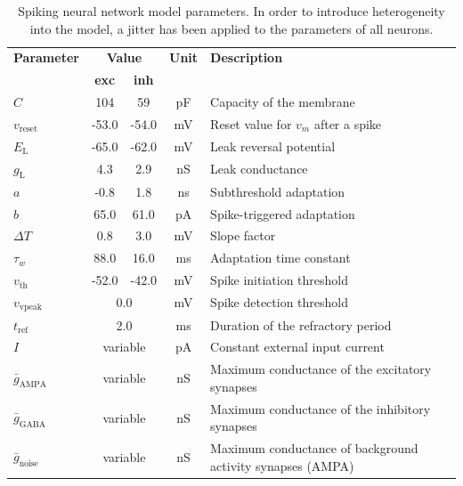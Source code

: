 \documentclass[../main.tex]{subfiles}
\begin{document}
\begin{table}[htbp]
    \caption{Spiking neural network model parameters.
    In order to introduce heterogeneity into the model, a jitter has been applied to the parameters of all neurons.}
    \label{tab:snmparams}
    \def\arraystretch{1.2}%
    \begin{tabularx}{\textwidth}{|l|c|c|c|X|}
        \hline 
        \textbf{Parameter} & \multicolumn{2}{c|}{\textbf{Value}} & 
        \textbf{Unit} &     \textbf{Description} \\ 
        \cline{2-3}
        & \textbf{exc} & \textbf{inh} &  & \\ 
        \hline
        $C$ & 104 & 59 &  pF & Capacity of the membrane \\ 
        \hline
        $v_\text{reset}$ & -53.0 & -54.0 & mV & Reset value for $v_m$ after a spike \\
        \hline
        $E_\text{L}$ & -65.0 & -62.0 & mV & Leak reversal potential \\
        \hline
        $g_\text{L}$ & 4.3 & 2.9 & nS & Leak conductance \\
        \hline  
        $a$ & -0.8 & 1.8 & ns & Subthreshold adaptation \\
        \hline 
        $b$ & 65.0 & 61.0 & pA & Spike-triggered adaptation \\
        \hline 
        $\Delta T$ & 0.8 & 3.0 & mV & Slope factor\\
        \hline 
        $\tau_w$ & 88.0 & 16.0 & ms & Adaptation time constant \\
        \hline 
        $v_\text{th}$ & -52.0 & -42.0 & mV & Spike initiation threshold\\
        \hline 
        $v_\text{vpeak}$ & \multicolumn{2}{c|}{0.0} & mV & Spike detection threshold\\
        \hline
        $t_\text{ref}$ & \multicolumn{2}{c|}{2.0} & ms & Duration of the refractory period \\
        \hline 
        $I$ & \multicolumn{2}{c|}{variable} & pA & Constant external input current \\
        \hline
        $\bar{g}_\text{AMPA}$ & \multicolumn{2}{c|}{variable} & nS & Maximum conductance of the excitatory synapses \\
        \hline
        $\bar{g}_\text{GABA}$ & \multicolumn{2}{c|}{variable} & nS & Maximum conductance of the inhibitory synapses \\
        \hline
        $\bar{g}_\text{noise}$ & \multicolumn{2}{c|}{variable} & nS & Maximum conductance of background activity synapses (AMPA) \\

\end{tabularx}
\end{table}
\end{document}
